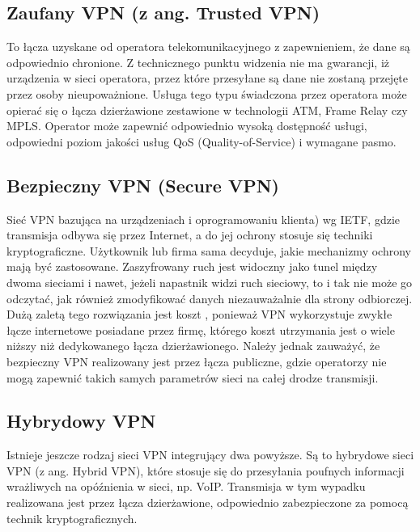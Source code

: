 \documentclass[main.tex]{subfiles}
\begin{document}
    \subsection{Zaufany VPN (z ang. Trusted VPN)}
    To łącza uzyskane od operatora telekomunikacyjnego z zapewnieniem, że dane są odpowiednio chronione. Z technicznego punktu widzenia nie ma gwarancji, iż urządzenia w sieci operatora, przez które przesyłane są dane nie zostaną przejęte przez osoby nieupoważnione. Usługa tego typu świadczona przez operatora może opierać się o łącza dzierżawione zestawione w technologii ATM, Frame Relay czy MPLS. Operator może zapewnić odpowiednio wysoką dostępność usługi, odpowiedni poziom jakości usług QoS (Quality-of-Service) i wymagane pasmo.


    \subsection{Bezpieczny VPN (Secure VPN)}
    Sieć VPN bazująca na urządzeniach i oprogramowaniu klienta) wg IETF, gdzie transmisja odbywa się przez Internet, a do jej ochrony stosuje się techniki kryptograficzne. Użytkownik lub firma sama decyduje, jakie mechanizmy ochrony mają być zastosowane. Zaszyfrowany ruch jest widoczny jako tunel między dwoma sieciami i nawet, jeżeli napastnik widzi ruch sieciowy, to i tak nie może go odczytać, jak również zmodyfikować danych niezauważalnie dla strony odbiorczej. Dużą zaletą tego rozwiązania jest koszt , ponieważ VPN wykorzystuje zwykłe łącze internetowe posiadane przez firmę, którego koszt utrzymania jest o wiele niższy niż dedykowanego łącza dzierżawionego. Należy jednak zauważyć, że bezpieczny VPN realizowany jest przez łącza publiczne, gdzie operatorzy nie mogą zapewnić takich samych parametrów sieci na całej drodze transmisji.

    \subsection{Hybrydowy VPN}
    Istnieje jeszcze rodzaj sieci VPN integrujący dwa powyższe. Są to hybrydowe sieci VPN (z ang. Hybrid VPN), które stosuje się do przesyłania poufnych informacji wrażliwych na opóźnienia w sieci, np. VoIP. Transmisja w tym wypadku realizowana jest przez łącza dzierżawione, odpowiednio zabezpieczone za pomocą technik kryptograficznych.
\end{document}
